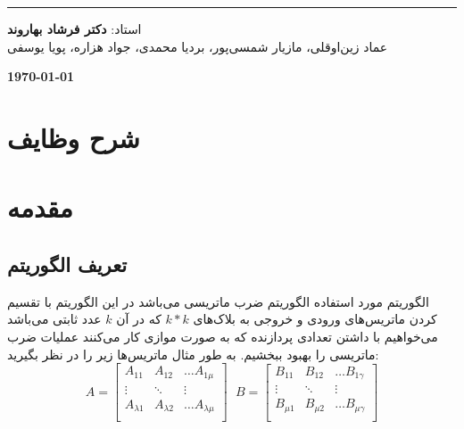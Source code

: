 \documentclass[12pt,onecolumn,a4paper,fleqn]{article}
\begin{document}
\begin{titlepage}
\begin{center}
		\noindent\rule[1ex]{\linewidth}{1pt}
		\vspace{1.5cm}
		\begin{Large}{
				استاد:
				\textbf{
					دکتر فرشاد بهاروند \\
				}
				عماد زین‌اوقلی، مازیار شمسی‌پور، بردیا محمدی، جواد هزاره، پویا یوسفی
				
				\vspace{1.5cm}
				\textbf{\today}
			}
		\end{Large}
		
	\end{center}
	\thispagestyle{empty}
\end{titlepage}	

\pagebreak

\tableofcontents
\thispagestyle{empty}
\pagebreak


\section*{شرح وظایف}


\pagebreak



\section{مقدمه}
	
	\subsection{تعریف الگوریتم}
	الگوریتم مورد استفاده الگوریتم ضرب ماتریسی  می‌باشد در این الگوریتم با تقسیم کردن ماتریس‌های ورودی و خروجی به بلاک‌های $k*k$ که در آن $k$ عدد ثابتی می‌باشد می‌خواهیم با داشتن تعدادی پردازنده‌ که به صورت موازی کار می‌کنند عملیات ضرب ماتریسی را بهبود ببخشیم. به طور مثال ماتریس‌ها زیر را در نظر بگیرید:
	\begin{equation}
	A = \begin{bmatrix}
	A_{11}& A_{12}& \dots A_{1\mu}\\
	\vdots& \ddots& \vdots\\
	A_{\lambda1}& A_{\lambda2}& \dots A_{\lambda\mu}\\
	\end{bmatrix} 
	\ \ \, 
	B = \begin{bmatrix}
	B_{11}& B_{12}& \dots B_{1\gamma}\\
	\vdots& \ddots& \vdots\\
	B_{\mu1}& B_{\mu2}& \dots B_{\mu\gamma}\\
	\end{bmatrix} 
	\end{equation}
	
\end{document}
